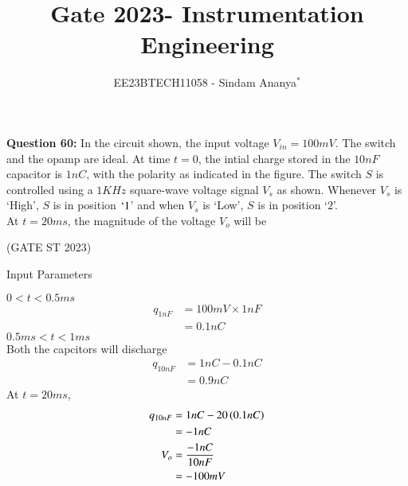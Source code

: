 \documentclass[journal,12pt,twocolumn]{IEEEtran}
\theoremstyle{remark}
\begin{document}

\vspace{3cm}

\title{Gate 2023- Instrumentation Engineering}
\author{EE23BTECH11058 - Sindam Ananya$^{*}$%
}
\maketitle
\newpage
\bigskip

\renewcommand{\thefigure}{\theenumi}
\renewcommand{\thetable}{\theenumi}

\vspace{3cm}
\textbf{Question 60:} 
In the circuit shown, the input voltage $V_{in} = 100mV$. The switch and the opamp are ideal. At time $t=0$, the intial charge stored in the $10nF$ capacitor is $1nC$, with the polarity as indicated in the figure. The switch $S$ is controlled using a $1KHz$ square-wave voltage signal $V_s$ as shown. Whenever $V_s$ is `High', $S$ is in position $`1$' and when $V_s$ is `Low', $S$ is in position `$2$'.\\
At $t = 20ms$, the magnitude of the voltage $V_o$ will be  \\  
\begin{figure}[ht]
  \centering
    \resizebox{0.55\columnwidth}{!}{}
\end{figure}
\hfill{(GATE ST 2023)}\\
\solution
\begin{table}[h!]
    \centering
    
    \caption{Input Parameters}
    \label{tab:gatein60table}
\end{table}
$ 0 < t < 0.5ms $
\begin{align}
q_{1nF} &= 100mV \times 1nF\\ 
        &= 0.1nC
\end{align}
$ 0.5ms < t < 1ms $\\
Both the capcitors will discharge
\begin{align}
q_{10nF} &= 1nC - 0.1nC\\
         &= 0.9nC
\end{align}
At $t = 20ms$,
\begin{align}
q_{10nF} &= 1nC - 20 \left(0.1nC\right)\\
         &= -1nC\\
V_o &= \frac{-1nC}{10nF}\\
    &= -100mV
\end{align}
\end{document}
